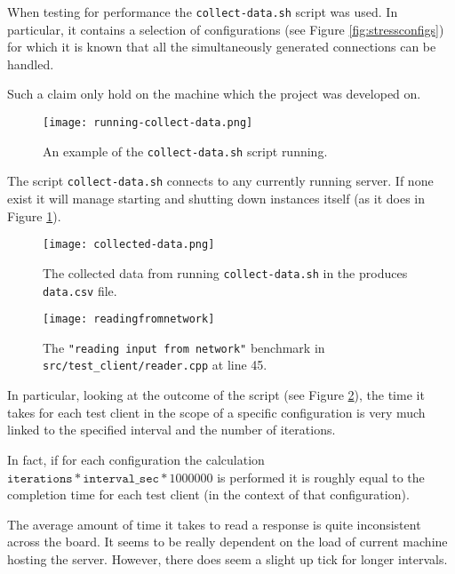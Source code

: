 \documentclass[article]{uom-coursework}
\begin{document}
When testing for performance the \texttt{collect-data.sh} script
was used. In particular, it contains a selection of
configurations (see Figure \ref{fig:stressconfigs}) for which it
is known that all the simultaneously generated connections can
be handled.

\begin{marker}
    Such a claim only hold on the machine which the project
    was developed on.
\end{marker}

\begin{figure}[H]
\centering
\texttt{[image: running-collect-data.png]}
\caption{An example of the \texttt{collect-data.sh} script
running.}
\label{fig:runningcollectdata}
\end{figure}

\begin{marker}
    The script \texttt{collect-data.sh} connects to any
    currently running server. If none exist it will manage
    starting and shutting down instances itself (as it does in
    Figure \ref{fig:runningcollectdata}).
\end{marker}

\begin{figure}[H]
\centering
\texttt{[image: collected-data.png]}
\caption{The collected data from running
\texttt{collect-data.sh} in the produces \texttt{data.csv}
file.}
\label{fig:collecteddata}
\end{figure}

\begin{figure}[H]
\centering
\texttt{[image: readingfromnetwork]}
\caption{The \texttt{"reading input from network"} benchmark in
\texttt{src/test\_client/reader.cpp} at line 45.}
\label{fig:readingfromnetwork}
\end{figure}

In particular, looking at the outcome of the script (see Figure
\ref{fig:collecteddata}), the time it takes for each test client
in the scope of a specific configuration is very much linked to
the specified interval and the number of iterations.

In fact, if for each configuration the calculation
$\mathtt{iterations} * \mathtt{interval\_sec} * 1000000$ is
performed it is roughly equal to the completion time for each
test client (in the context of that configuration).

The average amount of time it takes to read a response is quite
inconsistent across the board. It seems to be really dependent
on the load of current machine hosting the server. However,
there does seem a slight up tick for longer intervals.
\end{document}
